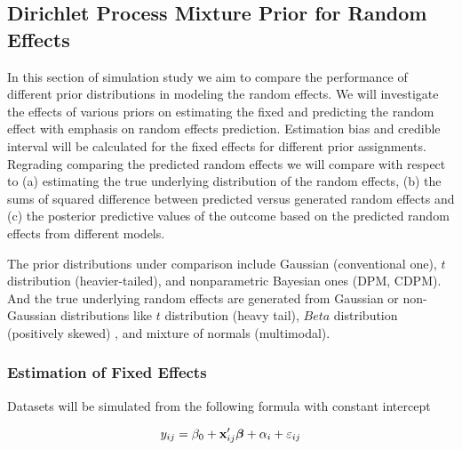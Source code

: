 \documentclass[12pt]{article}
\begin{document}


\subsection{Dirichlet Process Mixture Prior for Random Effects}%
In this section of simulation study we aim to compare the performance of different prior distributions in modeling the random effects. We will investigate the effects of various priors on estimating the fixed and predicting the random effect with emphasis on random effects prediction. Estimation bias and credible interval will be calculated for the fixed effects for different prior assignments.  Regrading comparing the predicted random effects we will compare with respect to (a) estimating the true underlying distribution of the random effects, (b) the sums of squared difference between predicted versus generated random effects and (c) the posterior predictive values of the outcome based on the predicted random effects from different models.

The prior distributions under comparison include Gaussian (conventional one), $t$ distribution (heavier-tailed), and nonparametric Bayesian ones (DPM, CDPM). And the true underlying random effects are generated from Gaussian or non-Gaussian distributions like $t$ distribution (heavy tail), $Beta$ distribution (positively skewed) , and mixture of normals (multimodal).   \par


\subsubsection{Estimation of Fixed Effects}%

Datasets will be simulated from the following formula with constant intercept 

\begin{equation}\label{eqn:sim_model2} 
y_{ij}=\beta_0+{\bf x}_{ij}'\boldsymbol{\beta}+\alpha_i+\varepsilon_{ij}
\end{equation}
\end{document}

